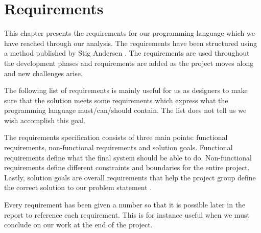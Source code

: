 \chapter{Requirements}
\label{chap:requirements}
This chapter presents the requirements for our programming language which we
have reached through our analysis. The requirements have been structured using a
method published by Stig Andersen \cite{requirementsGuide}. The requirements are
used throughout the development phases and requirements are added as the project
moves along and new challenges arise. 


The following list of requirements is mainly useful for us as designers to make
sure that the solution meets some requirements which express what the
programming language must/can/should contain. The list does not tell us we wish
accomplish this goal.

The requirements specification consists of three main points: functional
requirements, non-functional requirements and solution goals. Functional
requirements define what the final system should be able to do. Non-functional
requirements define different constraints and boundaries for the entire project.
Lastly, solution goals are overall requirements that help the project group
define the correct solution to our problem statement \cite{requirementsGuide}.

Every requirement has been given a number so that it is possible later in the
report to reference each requirement. This is for instance useful when we must
conclude on our work at the end of the project.


